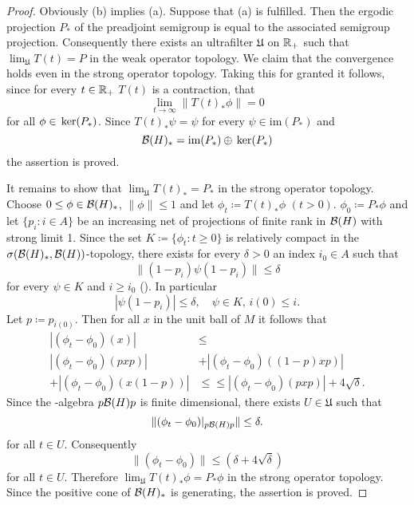 \begin{proof}
Obviously (b) implies (a).
Suppose that (a) is fulfilled.
Then the ergodic projection $ P_{*} $  of the preadjoint semigroup is equal to the associated semigroup projection.
Consequently there exists an ultrafilter $ \mathfrak{U} $  on $ \mathbb{R}_{+} $  such that $ \lim_{\mathfrak{U}} T(t) = P $  in the weak operator topology.
We claim that the convergence holds even in the strong operator topology.
Taking this for granted it follows, since for every $ t \in \mathbb{R}_{+} $  $ T(t) $  is a contraction, that
\[
\lim_{t \to \infty} \|T(t)_{*}\phi\| = 0
\]
for all $ \phi \in \mathop{}\mathrm{ker}(P_{*}) $.
Since $ T(t)_{*}\psi = \psi $  for every $ \psi \in \text{im}(P_{*}) $  and
\[
\mathcal{B}(H)_{*} = \text{im}(P_{*}) \oplus \mathop{}\mathrm{ker}(P_{*})
\]
the assertion is proved.

It remains to show that $ \lim_{\mathfrak{U}} T(t)_{*} = P_{*} $  in the strong operator topology.
Choose $ 0 \leq \phi \in \mathcal{B}(H)_{*} $, $ \|\phi\| \leq 1 $  and let $ \phi_{t} \coloneqq T(t)_{*}\phi $  $ (t>0) $.
$ \phi_{0} \coloneqq P_{*}\phi $  and let $ \{p_{i}: i \in A\} $  be an increasing net of projections of finite rank in $ \mathcal{B}(H) $  with strong limit 1.
Since the set $ K \coloneqq \{\phi_{t}: t \geq 0\} $  is relatively compact in the $ \sigma(\mathcal{B}(H)_{*},\mathcal{B}(H)) $-topology, there exists for every $ \delta > 0 $  an index $ i_{0} \in A $  such that
\[
\|(1 - p_{i})\psi(1 - p_{i})\| \leq \delta
\]
for every $ \psi \in K $  and $ i \geq i_{0} $  (\citet[Theorem III.5.4.(vi)]{takesaki:1979}).
In particular
\[
|\psi(1 - p_{i})| \leq \delta, \quad \psi \in K,\, i(0) \leq i.
\]
Let $ p \coloneqq p_{i(0)} $.
Then for all $ x $  in the unit ball of $ M $  it follows that
\begin{align*}
|(\phi_{t} - \phi_{0})(x)| &\leq \\
|(\phi_{t} - \phi_{0})(pxp)| &+ |(\phi_{t} - \phi_{0})((1-p)xp)| \\
+ |(\phi_{t} - \phi_{0})(x(1-p))| &\leq 
\leq |(\phi_{t} - \phi_{0})(pxp)| + 4\sqrt{\delta} .
\end{align*}
Since the \WA-algebra $ p \mathcal{B}(H) p $  is finite dimensional, there exists $ U \in \mathfrak{U} $  such that
\[
	\|(\phi_{t} - \phi_{0})|_{p \mathcal{B}(H) p}\| \leq \delta .
\]
for all $ t \in U $.
Consequently
\[
\|(\phi_{t} - \phi_{0})\| \leq (\delta + 4\sqrt{\delta})
\]
for all $ t \in U $.
Therefore $ \lim_{\mathfrak{U}} T(t)_{*}\phi = P_{*}\phi $  in the strong operator topology.
Since the positive cone of $ \mathcal{B}(H)_{*} $  is generating, the assertion is proved.
\end{proof}
